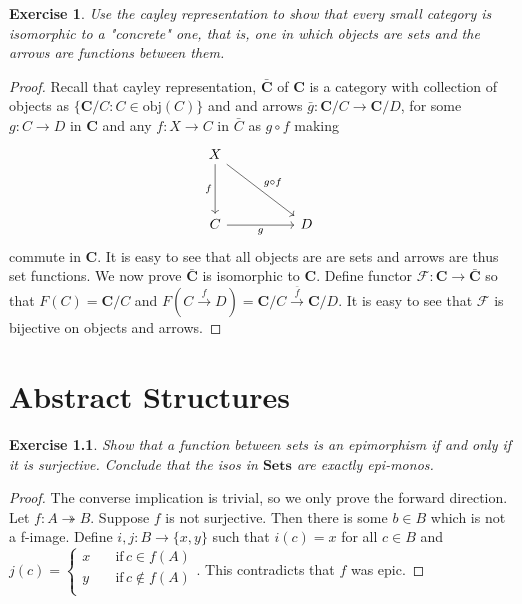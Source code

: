 \documentclass[a4paper, 11pt]{book}
\theoremstyle{plain}
\newtheorem{exercise}{Exercise}[chapter]
\theoremstyle{plain}
\newcommand{\mb}{\mathbf}
\newcommand{\arr}{\rightarrow}
\newcommand{\obj}{\text{obj}}
\newcommand{\mc}{\mathcal}
\newcommand{\warr}{\xrightarrow}
\newcommand{\C}{\mathbf{C}}
\newcommand{\tarr}{\twoheadrightarrow}
\begin{document}
    \begin{exercise}
      Use the cayley representation to show that every small category is isomorphic to a "concrete" one, that is, one in which objects are sets and the arrows are functions between them.
    \end{exercise}
    \begin{proof}
      Recall that cayley representation, $\bar{\C}$ of $\C$ is a category with collection of objects as $\{\C/C: C \in \obj(C)\}$ and and arrows $\bar{g}: \C/C \arr \C/D$, for some $g: C \arr D$ in $\C$ and any $f:X \arr C$ in $\bar{C}$ as $g \circ f$ making 
      \[\begin{tikzcd}
        X \\
        \\
        C && D
        \arrow["{g \circ f}", from=1-1, to=3-3]
        \arrow["g"', from=3-1, to=3-3]
        \arrow["f"', from=1-1, to=3-1]
      \end{tikzcd}\]
      commute in $\C$. It is easy to see that all objects are are sets and arrows are thus set functions. We now prove $\bar{\C}$ is isomorphic to $\C$. Define functor $\mc{F}:\C \arr \bar{\C}$ so that $F(C)=\C/C$ and $F(C \warr{f} D)=\C/C \warr{\bar{f}} \C/D$. It is easy to see that $\mc{F}$ is bijective on objects and arrows.
    \end{proof}
  
  \chapter{Abstract Structures}
    \begin{exercise}
      Show that a function between sets is an epimorphism if and only if it is surjective. Conclude that the isos in $\mb{Sets}$ are exactly epi-monos.
    \end{exercise}
    \begin{proof}
      The converse implication is trivial, so we only prove the forward direction. Let $f:A \tarr B$. Suppose $f$ is not surjective. Then there is some $b \in B$ which is not a f-image. Define $i,j:B \arr \{x,y\}$ such that $i(c)=x$ for all $c \in B$ and $j(c)=
      \begin{cases}
        x \quad &\text{if} \, c \in f(A) \\
        y \quad &\text{if} \, c \notin f(A) \\
   \end{cases}.$
   This contradicts that $f$ was epic.
  \end{proof}
\end{document}
